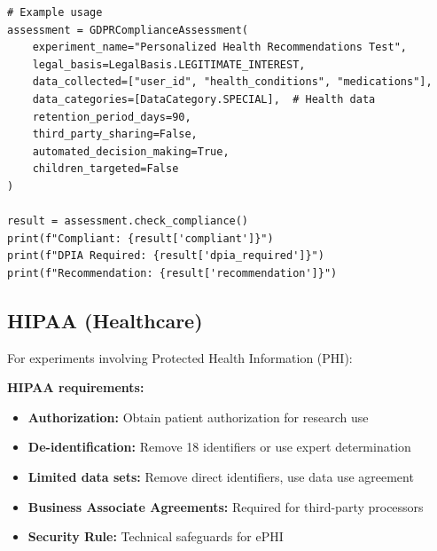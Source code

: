 \begin{lstlisting}
# Example usage
assessment = GDPRComplianceAssessment(
    experiment_name="Personalized Health Recommendations Test",
    legal_basis=LegalBasis.LEGITIMATE_INTEREST,
    data_collected=["user_id", "health_conditions", "medications"],
    data_categories=[DataCategory.SPECIAL],  # Health data
    retention_period_days=90,
    third_party_sharing=False,
    automated_decision_making=True,
    children_targeted=False
)

result = assessment.check_compliance()
print(f"Compliant: {result['compliant']}")
print(f"DPIA Required: {result['dpia_required']}")
print(f"Recommendation: {result['recommendation']}")
\end{lstlisting}

\subsection{HIPAA (Healthcare)}

For experiments involving Protected Health Information (PHI):

\textbf{HIPAA requirements:}
\begin{itemize}
    \item \textbf{Authorization:} Obtain patient authorization for research use
    \item \textbf{De-identification:} Remove 18 identifiers or use expert determination
    \item \textbf{Limited data sets:} Remove direct identifiers, use data use agreement
    \item \textbf{Business Associate Agreements:} Required for third-party processors
    \item \textbf{Security Rule:} Technical safeguards for ePHI
\end{itemize}

